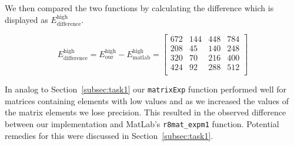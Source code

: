 \documentclass[paper=a4, fontsize=11pt]{article} %
\begin{document}
We then compared the two functions by calculating the difference which
is displayed as $E_{\text{difference}}^{\text{high}}$.


\[
  E_{\text{difference}}^{\text{high}} = E_{\text{our}}^{\text{high}} - E_{\text{matlab}}^{\text{high}} =
\begin{bmatrix}
 672 & 144 & 448 & 784 \\
 208 & 45 & 140 & 248 \\
 320 & 70 & 216 & 400 \\
 424 & 92 & 288 & 512 \\
\end{bmatrix}
\]

In analog to Section~\ref{subsec:task1} our \texttt{matrixExp}
function performed well for matrices containing elements with low
values and as we increased the values of the matrix elements we lose
precision. This resulted in the observed difference between our
implementation and MatLab's \texttt{r8mat\_{expm1}}
function. Potential remedies for this were discussed in
Section~\ref{subsec:task1}.



\end{document}
